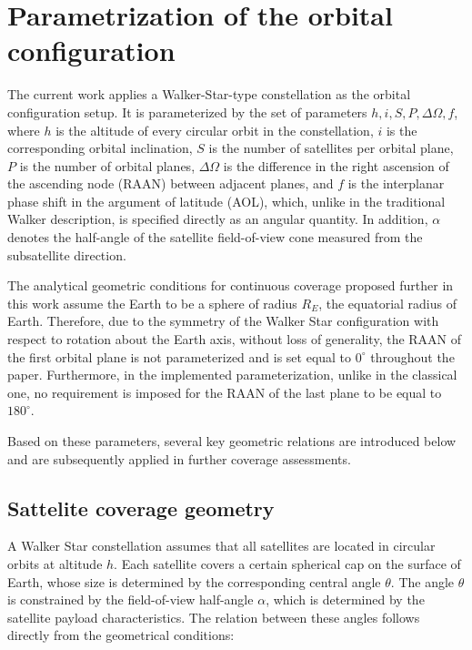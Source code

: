 \section{Parametrization of the orbital configuration}
\label{sec:parameterization}

The current work applies a Walker-Star-type constellation \cite{walker1971, wertz2001ocdm} as the orbital configuration setup. 
It is parameterized by the set of parameters $h, i, S, P, \Delta\Omega, f$, where $h$ is the altitude 
of every circular orbit in the constellation, $i$ is the corresponding orbital inclination, 
$S$ is the number of satellites per orbital plane, $P$ is the number of orbital planes, $\Delta\Omega$ 
is the difference in the right ascension of the ascending node (RAAN) between adjacent planes, 
and $f$ is the interplanar phase shift in the argument of latitude (AOL), which, unlike in the 
traditional Walker description, is specified directly as an angular quantity. In addition, 
$\alpha$ denotes the half-angle of the satellite field-of-view cone measured from the 
subsatellite direction.

The analytical geometric conditions for continuous coverage proposed further in this work assume 
the Earth to be a sphere of radius $R_E$, the equatorial radius of Earth. Therefore, due to the 
symmetry of the Walker Star configuration with respect to rotation about the Earth axis, without loss 
of generality, the RAAN of the first orbital plane is not parameterized and is set equal to $0^\circ$ 
throughout the paper. Furthermore, in the implemented parameterization, unlike in the classical one, 
no requirement is imposed for the RAAN of the last plane to be equal to $180^\circ$.

Based on these parameters, several key geometric relations are introduced below 
and are subsequently applied in further coverage assessments.

\subsection{Sattelite coverage geometry}
A Walker Star constellation assumes that all satellites are located in circular orbits 
at altitude $h$. Each satellite covers a certain spherical cap on the surface of Earth, 
whose size is determined by the corresponding central angle $\theta$. The angle $\theta$ is 
constrained by the field-of-view half-angle $\alpha$, which is determined by the satellite payload 
characteristics. The relation between these angles follows directly from the geometrical conditions:

